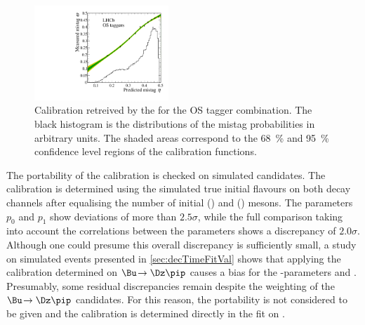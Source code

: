 \begin{figure}[tbp]
	\begin{center}
		\includegraphics[width=0.45\textwidth]{09FlavourTagging/figs/CalibrationOS.pdf}
	\end{center}
	\caption{Calibration retreived by the for the OS tagger combination.
	The black histogram is the distributions of the mistag probabilities in arbitrary units.
	The shaded areas correspond to the \SI{68}{\percent} and \SI{95}{\percent} confidence level regions of the calibration functions.}
	\label{fig:CalibOS}
\end{figure}

The portability of the calibration is checked on simulated candidates.
The calibration is determined using the simulated true initial flavours on both decay channels after equalising the number of initial \Bz (\Bu) and \Bzb (\Bm) mesons.
The parameters $p_0$ and $p_1$ show deviations of more than $2.5\sigma$, while the full comparison taking into account the correlations between the parameters shows a discrepancy of $2.0\sigma$.
Although one could presume this overall discrepancy is sufficiently small, a study on simulated events presented in \cref{sec:decTimeFitVal} shows that applying the calibration determined on $\Bu\!\to\Dz\pip$ causes a bias for the \CP-parameters \Sf and \Sfbar.
Presumably, some residual discrepancies remain despite the weighting of the $\Bu\!\to\Dz\pip$ candidates.
For this reason, the portability is not considered to be given and the calibration is determined directly in the \CP fit on \BdToDpi.
